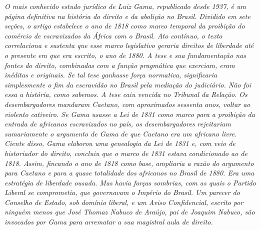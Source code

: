 \begin{flushleft}
{\footnotesize\itshape
O mais conhecido estudo
jurídico de Luiz Gama, republicado desde 1937,
é um página definitiva na história do direito e da abolição no
Brasil. Dividido em sete seções, o artigo estabelece o ano de 1818 como
marco temporal da proibição do comércio de escravizados da África com o
Brasil. Ato contínuo, o texto correlaciona e sustenta que esse marco
legislativo geraria direitos de liberdade até o presente em que era
escrito, o ano de 1880. A tese e sua fundamentação nas fontes do
direito, combinadas com a função pragmática que exerciam, eram
inéditas e originais. Se tal tese ganhasse força normativa,
significaria simplesmente o fim da escravidão no
Brasil pela mediação do judiciário. Não foi essa a história, como
sabemos. A tese caiu vencida no Tribunal da Relação. Os desembargadores
mandaram Caetano, com aproximados sessenta anos, voltar ao violento cativeiro.
Se Gama usasse a Lei de 1831 como marco para a proibição
da entrada de africanos escravizados no país, os desembargadores
rejeitariam sumariamente o argumento de Gama de que Caetano era um
africano livre. Ciente disso, Gama elaborou uma genealogia da Lei de
1831 e, com veio de historiador do direito, concluiu que o marco de 1831
estava condicionado ao de 1818. Assim, fincando o ano de 1818 como base,
ampliaria a razão do argumento para Caetano e para a quase totalidade
dos africanos no Brasil de 1880. Era uma estratégia de liberdade ousada.
Mas havia forças sombrias, com as quais o Partido Liberal se comprometia, que governavam o Império do Brasil. Um parecer do Conselho de Estado,
sob domínio liberal, e um Aviso Confidencial, escrito por ninguém menos
que José Thomaz Nabuco de Araújo, pai de Joaquim Nabuco, são invocados
por Gama para arrematar a sua magistral aula de direito. }
\end{flushleft}


